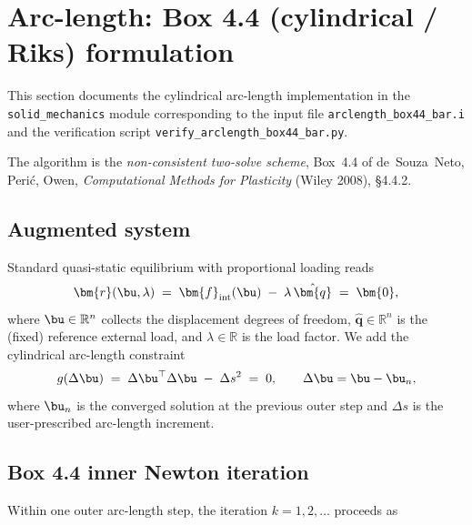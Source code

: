 \section{Arc-length: Box 4.4 (cylindrical / Riks) formulation}
\label{sec:arclength_box44}

This section documents the cylindrical arc-length implementation in the
\texttt{solid\_mechanics} module corresponding to the input file
\texttt{arclength\_box44\_bar.i} and the verification script
\texttt{verify\_arclength\_box44\_bar.py}.

The algorithm is the \emph{non-consistent two-solve scheme}, Box~4.4 of
de~Souza~Neto, Peri\'{c}, Owen, \emph{Computational Methods for Plasticity}
(Wiley 2008), \S4.4.2.

\subsection{Augmented system}

Standard quasi-static equilibrium with proportional loading reads
\begin{equation}
\bm{r}(\bu, \lambda) \;=\; \bm{f}_{\rm int}(\bu) \;-\; \lambda\, \hat{\bm{q}} \;=\; \bm{0},
\end{equation}
where $\bu \in \mathbb{R}^{n}$ collects the displacement degrees of freedom,
$\hat{\bm{q}} \in \mathbb{R}^{n}$ is the (fixed) reference external load, and
$\lambda \in \mathbb{R}$ is the load factor. We add the cylindrical arc-length
constraint
\begin{equation}
g(\Delta\bu) \;=\; \Delta\bu^{\top}\Delta\bu \;-\; \Delta s^2 \;=\; 0,
\qquad \Delta\bu = \bu - \bu_{n},
\end{equation}
where $\bu_{n}$ is the converged solution at the previous outer step and
$\Delta s$ is the user-prescribed arc-length increment.

\subsection{Box 4.4 inner Newton iteration}

Within one outer arc-length step, the iteration $k=1,2,\dots$ proceeds as

